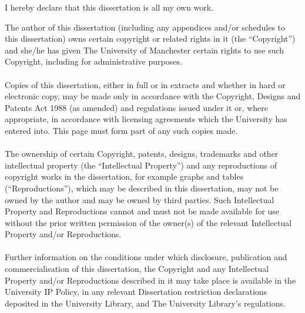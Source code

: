 \cleardoublepage


\begin{declaration}

I hereby declare that this dissertation is all my own work.

\end{declaration}

\begin{mycopyright}
The author of this dissertation (including any appendices and/or schedules to this dissertation) owns certain copyright or related rights in it (the “Copyright”) and she/he has given The University of Manchester certain rights to use such Copyright, including for administrative purposes. \\
\\Copies of this dissertation, either in full or in extracts and whether in hard or electronic copy, may be made only in accordance with the Copyright, Designs and Patents Act 1988 (as amended) and regulations issued under it or, where appropriate, in accordance with licensing agreements which the University has entered into. This page must form part of any such copies made.\\
\\The ownership of certain Copyright, patents, designs, trademarks and other intellectual property (the “Intellectual Property”) and any reproductions of copyright works in the dissertation, for example graphs and tables (“Reproductions”), which may be described in this dissertation, may not be owned by the author and may be owned by third parties. Such Intellectual Property and Reproductions cannot and must not be made available for use without the prior written permission of the owner(s) of the relevant Intellectual Property and/or Reproductions.\\
\\Further information on the conditions under which disclosure, publication and commercialisation of this dissertation, the Copyright and any Intellectual Property and/or Reproductions described in it may take place is available in the University IP Policy, in any relevant Dissertation restriction declarations deposited in the University Library, and The University Library’s regulations.
\end{mycopyright}

